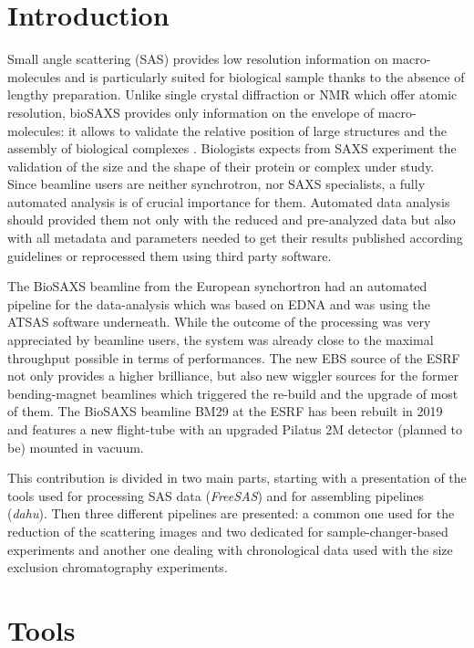 \documentclass[preprint]{iucr}              %
\begin{document}
\section{Introduction}
Small angle scattering (SAS) provides low resolution information on macro-molecules and is  
particularly suited for biological sample thanks to the absence of lengthy preparation.
Unlike single crystal diffraction or NMR which offer atomic resolution, bioSAXS provides only information on the envelope of macro-molecules: it allows to validate the relative position of large structures and the assembly of biological complexes \cite{biosaxs_rev2018}. 
Biologists expects from SAXS experiment the validation of the size and the shape of their protein or complex under study. 
Since beamline users are neither synchrotron, nor SAXS specialists, a fully automated analysis is of crucial importance for them. 
Automated data analysis should provided them not only with the reduced and pre-analyzed data but also with all metadata and parameters needed to get their results published according guidelines \cite{guidelines_2017} or  reprocessed them using third party software. 

The BioSAXS beamline from the European synchortron \cite{BM29paper} had an automated pipeline for the data-analysis which was based on EDNA \cite{EDNA} and was using the ATSAS \cite{ATSAS2} software underneath. 
While the outcome of the processing was very appreciated by beamline users, the system was already close to the maximal throughput possible in terms of performances. 
The new EBS source \cite{EBS} of the ESRF not only provides a higher brilliance, but also new wiggler sources for the former bending-magnet beamlines which triggered the re-build and the upgrade of most of them. 
The BioSAXS beamline BM29 at the ESRF has been rebuilt in 2019 and features a new flight-tube with an upgraded  Pilatus 2M detector (planned to be) mounted in vacuum. 

This contribution is divided in two main parts, starting with a presentation of the tools used for 
processing SAS data (\textit{FreeSAS}) and for assembling pipelines (\textit{dahu}).
Then three different pipelines are presented: a common one used for the reduction of the scattering images and two dedicated for sample-changer-based experiments and another one dealing with chronological data used with the size exclusion chromatography experiments.      

\section{Tools}
\end{document}
